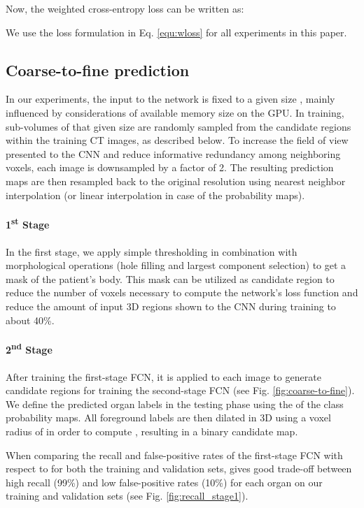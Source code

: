 \documentclass[authoryear]{elsarticle}
\begin{document}
\textcolor{revision}{Now, the weighted cross-entropy loss can be written as:}

\textcolor{revision}{We use the loss formulation in Eq. \ref{equ:wloss} for all experiments in this paper.}
\subsection{Coarse-to-fine prediction}
In our experiments, the input to the network is fixed to a given size , mainly influenced by considerations of available memory size on the GPU. In training, sub-volumes of that given size are randomly sampled from the candidate regions within the training CT images, as described below. To increase the field of view presented to the CNN and reduce informative redundancy among neighboring voxels, each image is downsampled by a factor of 2. The resulting prediction maps are then resampled back to the original resolution using nearest neighbor interpolation (or linear interpolation in case of the probability maps). 

\paragraph{\textcolor{revision}{1\textsuperscript{st} Stage}}
In the first stage, we apply simple thresholding in combination with morphological operations (hole filling and largest component selection) to get a mask of the patient's body. This mask can be utilized as candidate region  to reduce the number of voxels necessary to compute the network's loss function and reduce the amount of input 3D regions shown to the CNN during training to about 40\%. 
\paragraph{\textcolor{revision}{2\textsuperscript{nd} Stage}}
\textcolor{revision}{After training the first-stage FCN}, it is applied to each image to generate candidate regions  for training the second-stage FCN \textcolor{revision}{(see Fig. \ref{fig:coarse-to-fine})}. We define the \textcolor{revision}{predicted} organ labels in the testing phase using the  of the class probability maps. \textcolor{revision}{All foreground labels are then dilated in 3D using a voxel radius of  in order to compute , resulting in a binary candidate map}. 

When comparing the recall and false-positive rates of \textcolor{revision}{the} first-stage FCN with respect to  for both the training and validation sets,  gives good trade-off between high recall (99\%) and low false-positive rates (10\%) for each organ on our training and validation sets (see Fig. \ref{fig:recall_stage1}). 
\end{document}
